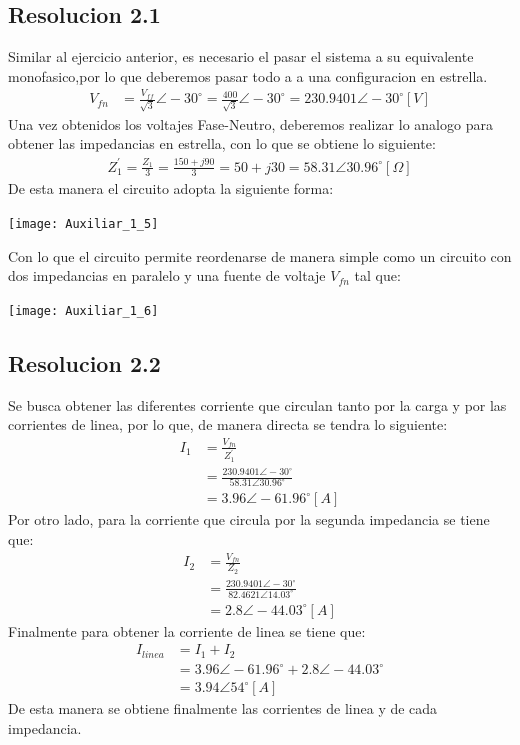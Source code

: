 \documentclass[
  11pt,
  letterpaper,
   addpoints,
   answers
  ]{exam}
\begin{document}
\begin{questions}
\begin{solution}
\subsection*{Resolucion 2.1}
    Similar al ejercicio anterior, es necesario el pasar el sistema a su equivalente monofasico,por lo que deberemos pasar todo a a una configuracion en estrella.
    \begin{align}
        V_{fn} &= \frac{V_{ff}}{\sqrt{3}}\angle -30^{\circ} 
               = \frac{400}{\sqrt{3}} \angle -30^{\circ} 
               = 230.9401 \angle -30^{\circ}[V]
    \end{align}
Una vez obtenidos los voltajes Fase-Neutro, deberemos realizar lo analogo para obtener las impedancias en estrella, con lo que se obtiene lo siguiente:
\begin{align}
    Z^{'}_{1}= \frac{Z_{1}}{3} = \frac{150 + j90}{3}= 50 + j30 = 58.31 \angle 30.96^{\circ} [\Omega]
\end{align}
De esta manera el circuito adopta la siguiente forma:
\begin{center}
    \texttt{[image: Auxiliar\_1\_5]}
  \end{center}
Con lo que el circuito permite reordenarse de manera simple como un circuito con dos impedancias en paralelo y una fuente de voltaje $V_{fn}$ tal que:
\begin{center}
    \texttt{[image: Auxiliar\_1\_6]}
  \end{center}
\subsection*{Resolucion 2.2}
Se busca obtener las diferentes corriente que circulan tanto por la carga y por las corrientes de linea, por lo que, de manera directa se tendra lo siguiente:
\begin{align}
    I_{1} &= \frac{V_{fn}}{Z^{'}_{1}}\\
          &= \frac{230.9401 \angle -30^{\circ}}{58.31 \angle 30.96^{\circ}}\\
            &= 3.96 \angle -61.96^{\circ} [A]
\end{align}
Por otro lado, para la corriente que circula por la segunda impedancia se tiene que:
\begin{align}
    I_{2} &= \frac{V_{fn}}{Z_{2}}\\
          &= \frac{230.9401 \angle -30^{\circ}}{82.4621 \angle 14.03^{\circ}}\\
            &= 2.8 \angle -44.03^{\circ} [A]
\end{align}
Finalmente para obtener la corriente de linea se tiene que:
\begin{align}
    I_{linea} &= I_{1} + I_{2}\\
              &= 3.96 \angle -61.96^{\circ} + 2.8 \angle -44.03^{\circ}\\
              &= 3.94\angle 54^{\circ} [A]
\end{align}
De esta manera se obtiene finalmente las corrientes de linea y de cada impedancia.

\end{solution}
\end{questions}
\end{document}

